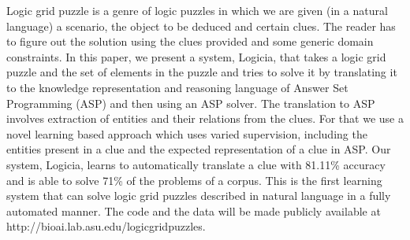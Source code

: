 Logic grid puzzle is a genre of logic puzzles in which we are given (in a natural language) a scenario, the object to be deduced and certain clues. The reader has to figure out the solution using the clues provided and some generic domain constraints. In this paper, we present a system, Logicia, that takes  a logic grid puzzle and the set of elements in the puzzle and tries to solve it by translating it to the knowledge representation and reasoning language of Answer Set Programming (ASP) and then using an ASP solver. The translation to ASP involves extraction of entities and their relations from the clues. For that we use a novel learning based approach which uses varied supervision, including the entities present in a clue and the expected representation of a clue in ASP. Our system, Logicia, learns to  automatically translate a clue with 81.11\% accuracy and is able to solve 71\% of the problems of a corpus. This is the first learning system that can solve logic grid puzzles described in natural language in a fully automated manner. The code and the data will be made publicly available at http://bioai.lab.asu.edu/logicgridpuzzles.

